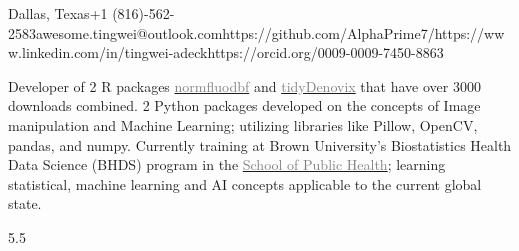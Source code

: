 \documentclass[9pt]{adeckcv} %
\begin{document}
  
{Dallas, Texas}{+1 (816)-562-2583}{awesome.tingwei@outlook.com}{https://github.com/AlphaPrime7/}{https://www.linkedin.com/in/tingwei-adeck}{https://orcid.org/0009-0009-7450-8863}

  

\begin{minipage}[t]{0.4\textwidth}
\vspace{-\baselineskip} 

{Developer of 2 R packages \href{https://alphaprime7.github.io/normfluodbf/}{\textcolor{gray}{normfluodbf}} and \href{https://alphaprime7.github.io/tidyDenovix/}{\textcolor{gray}{tidyDenovix}} that have over 3000 downloads combined. 2 Python packages developed on the concepts of Image manipulation and Machine Learning; utilizing libraries like Pillow, OpenCV, pandas, and numpy. }
{Currently training at Brown University's Biostatistics Health Data Science (BHDS) program in the \href{https://sph.brown.edu/}{\textcolor{gray}{School of Public Health}}; \space learning statistical, machine learning and AI concepts applicable to the current global state. }
\end{minipage}
\hfill %
\begin{minipage}[t]{0.5\textwidth} %
	\vspace{-\baselineskip} %
	\begin{barchart}{5.5}
	\end{barchart}
\end{minipage}
\end{document}
